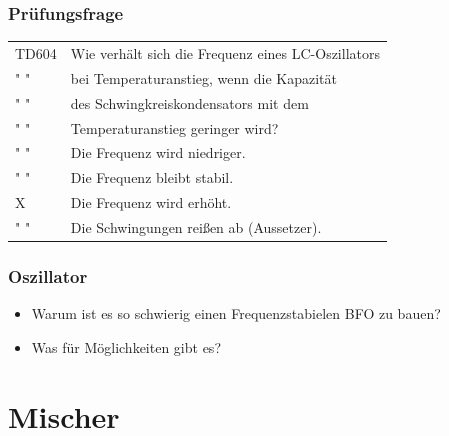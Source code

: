 \begin{frame}
    \frametitle{Prüfungsfrage}

    \begin{center}
    \begin{tabular}{l||l}\hline
        TD604 &Wie verhält sich die Frequenz eines LC-Oszillators \\
         " "  & bei Temperaturanstieg, wenn die Kapazität \\
         " "  & des Schwingkreiskondensators mit dem \\
         " "  & Temperaturanstieg geringer wird? \\ \hline\hline
         " " & Die Frequenz wird niedriger. \\\hline
         " " & Die Frequenz bleibt stabil. \\\hline
         X & Die Frequenz wird erhöht. \\ \hline
         " " & Die Schwingungen reißen ab (Aussetzer).\\\hline
    \end{tabular}
 	\end{center}
\end{frame}

\begin{frame}
    \frametitle{Oszillator}
    \begin{center}
    \begin{itemize}
			\item Warum ist es so schwierig einen Frequenzstabielen BFO zu bauen?
			\item Was für Möglichkeiten gibt es?
    \end{itemize}
	\end{center}
\end{frame}

\section*{Mischer}

